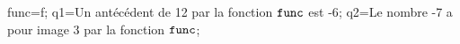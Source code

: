 \documentclass[exercice]{thedocument}%
\begin{document}
%
    \>func=f;%
    \>q1={Un antécédent de 12 par la fonction $\<func;$ est -6};%
    \>q2={Le nombre -7 a pour image 3 par la fonction $\<func;$};%
\end{document}
